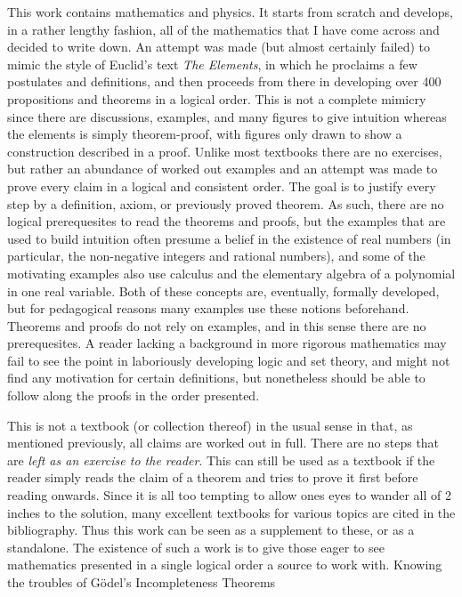This work contains mathematics and physics. It starts from scratch and develops,
in a rather lengthy fashion, all of the mathematics that I have come across and
decided to write down. An attempt was made (but almost certainly failed) to
mimic the style of Euclid's text \textit{The Elements}, in which he proclaims a
few postulates and definitions, and then proceeds from there in developing over
400 propositions and theorems in a logical order. This is not a complete mimicry
since there are discussions, examples, and many figures to give intuition
whereas the elements is simply theorem-proof, with figures only drawn to show a
construction described in a proof. Unlike most textbooks there are no exercises,
but rather an abundance of worked out examples and an attempt was made to prove
every claim in a logical and consistent order. The goal is to justify every step
by a definition, axiom, or previously proved theorem. As such, there are no
logical prerequesites to read the theorems and proofs, but the examples that are
used to build intuition often presume a belief in the existence of real numbers
(in particular, the non-negative integers and rational numbers), and some of
the motivating examples also use calculus and the elementary algebra of a
polynomial in one real variable. Both of these concepts are, eventually,
formally developed, but for pedagogical reasons many examples use these notions
beforehand. Theorems and proofs do not rely on examples, and in this sense there
are no prerequesites. A reader lacking a background in more rigorous mathematics
may fail to see the point in laboriously developing logic and set theory, and
might not find any motivation for certain definitions, but nonetheless should be
able to follow along the proofs in the order presented.
\par\hfill\par
This is not a textbook (or collection thereof) in the usual sense in that, as
mentioned previously, all claims are worked out in full. There are no steps that
are \textit{left as an exercise to the reader}. This can still be used as a
textbook if the reader simply reads the claim of a theorem and tries to prove
it first before reading onwards. Since it is all too tempting to allow ones eyes
to wander all of 2 inches to the solution, many excellent textbooks for various
topics are cited in the bibliography. Thus this work can be seen as a supplement
to these, or as a standalone. The existence of such a work is to give those
eager to see mathematics presented in a single logical order a source to work
with. Knowing the troubles of G\"{o}del's Incompleteness Theorems
